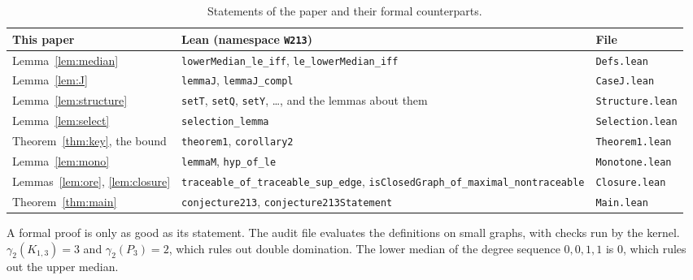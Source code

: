 \documentclass[11pt,a4paper]{article}
\theoremstyle{remark}
\begin{document}
\begin{table}[ht]
\centering\small
\begin{tabular}{@{}>{\raggedright\arraybackslash}p{3.3cm}p{8.4cm}l@{}}
\toprule
This paper & Lean (namespace \texttt{W213}) & File\\
\midrule
Lemma~\ref{lem:median} & \texttt{lowerMedian\_le\_iff}, \texttt{le\_lowerMedian\_iff} & \texttt{Defs.lean}\\
Lemma~\ref{lem:J} & \texttt{lemmaJ}, \texttt{lemmaJ\_compl} & \texttt{CaseJ.lean}\\
Lemma~\ref{lem:structure} & \texttt{setT}, \texttt{setQ}, \texttt{setY}, \dots, and the lemmas about them & \texttt{Structure.lean}\\
Lemma~\ref{lem:select} & \texttt{selection\_lemma} & \texttt{Selection.lean}\\
Theorem~\ref{thm:key}, the bound & \texttt{theorem1}, \texttt{corollary2} & \texttt{Theorem1.lean}\\
Lemma~\ref{lem:mono} & \texttt{lemmaM}, \texttt{hyp\_of\_le} & \texttt{Monotone.lean}\\
Lemmas~\ref{lem:ore}, \ref{lem:closure} & \texttt{traceable\_of\_traceable\_sup\_edge},\newline
  \texttt{isClosedGraph\_of\_maximal\_nontraceable} & \texttt{Closure.lean}\\
Theorem~\ref{thm:main} & \texttt{conjecture213}, \texttt{conjecture213Statement} & \texttt{Main.lean}\\
\bottomrule
\end{tabular}
\caption{Statements of the paper and their formal counterparts.}\label{tab:lean}
\end{table}

A formal proof is only as good as its statement. The audit file evaluates the definitions on
small graphs, with checks run by the kernel. $\gamma_2(K_{1,3})=3$ and $\gamma_2(P_3)=2$, which
rules out double domination. The lower median of the degree sequence $0,0,1,1$ is $0$, which
rules out the upper median.
\end{document}
